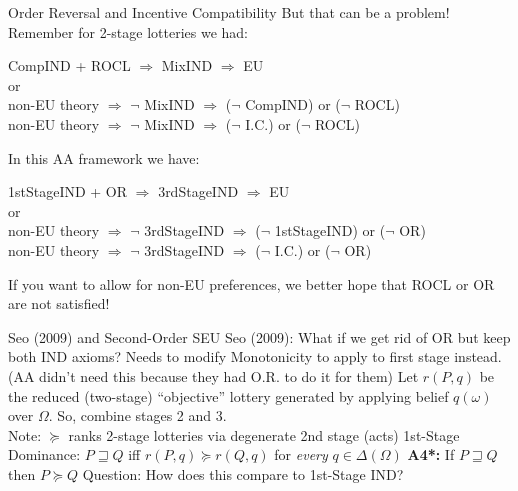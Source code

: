 \begin{frame}{Order Reversal and Incentive Compatibility}
But that can be a problem!\\
Remember for 2-stage lotteries we had:
\begin{center}
    CompIND + ROCL $\Rightarrow$ MixIND $\Rightarrow$ EU\\
    or\\
    non-EU theory $\Rightarrow$ $\neg$ MixIND $\Rightarrow$ ($\neg$ CompIND) or ($\neg$ ROCL)\\
    non-EU theory $\Rightarrow$ $\neg$ MixIND $\Rightarrow$ ($\neg$ I.C.) or ($\neg$ ROCL)\\
\end{center}
\br
In this AA framework we have:
\begin{center}
    1stStageIND + OR $\Rightarrow$ 3rdStageIND $\Rightarrow$ EU\\
    or\\
    non-EU theory $\Rightarrow$ $\neg$ 3rdStageIND $\Rightarrow$ ($\neg$ 1stStageIND) or ($\neg$ OR)\\
    non-EU theory $\Rightarrow$ $\neg$ 3rdStageIND $\Rightarrow$ ($\neg$ I.C.) or ($\neg$ OR)\\
\end{center}
\br
If you want to allow for non-EU preferences, we better hope that ROCL or OR are not satisfied!
\end{frame}

\begin{frame}{Seo (2009) and Second-Order SEU}
Seo (2009): What if we get rid of OR but keep both IND axioms?
\br
Needs to modify Monotonicity to apply to first stage instead.\\
(AA didn't need this because they had O.R. to do it for them)
\br
Let $r(P,q)$ be the reduced (two-stage) ``objective'' lottery generated by applying belief $q(\omega)$ over $\Omega$. So, combine stages 2 and 3.\\
Note: $\succeq$ ranks 2-stage lotteries via degenerate 2nd stage (acts)
\br
1st-Stage Dominance: $P\sqsupseteq Q$ iff $r(P,q)\succeq r(Q,q)$ for \textit{every} $q\in\Delta(\Omega)$
\br
\textbf{A4*:} If $P\sqsupseteq Q$ then $P\succeq Q$ 
\br
Question: How does this compare to 1st-Stage IND?
\end{frame}

